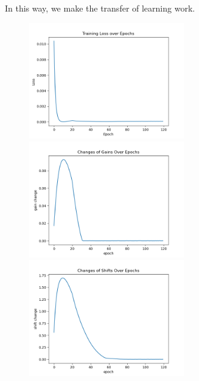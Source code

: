 \documentclass[12pt, a4paper]{article}
\begin{document}
In this way, we make the transfer of learning work.

\begin{figure}[H]
    \centering
    \includegraphics[width=0.6\textwidth]{FNN/fig/0221_abb05_bphebb_loss.png} \\
    \includegraphics[width=0.6\textwidth]{FNN/fig/0221_abb05_bphebb_gc.png} \\
    \includegraphics[width=0.6\textwidth]{FNN/fig/0221_abb05_bphebb_sc.png}
\end{figure}
\end{document}
